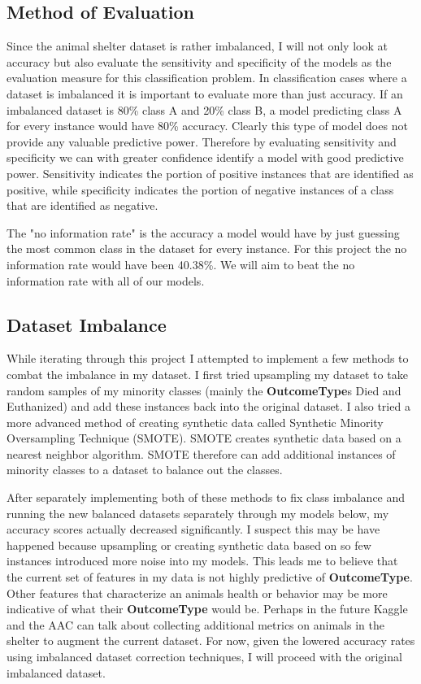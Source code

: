 \documentclass[12pt]{article} %
\begin{document}
\subsection{Method of Evaluation}
Since the animal shelter dataset is rather imbalanced, I will not only look at accuracy but also evaluate the sensitivity and specificity of the models as the evaluation measure for this classification problem. In classification cases where a dataset is imbalanced it is important to evaluate more than just accuracy. If an imbalanced dataset is 80\% class A and 20\% class B, a model predicting class A for every instance would have 80\% accuracy. Clearly this type of model does not provide any valuable predictive power. Therefore by evaluating sensitivity and specificity we can with greater confidence identify a model with good predictive power. Sensitivity indicates the portion of positive instances that are identified as positive, while specificity indicates the portion of negative instances of a class that are identified as negative. 

The "no information rate" is the accuracy a model would have by just guessing the most common class in the dataset for every instance. For this project the no information rate would have been 40.38\%. We will aim to beat the no information rate with all of our models. 

\subsection{Dataset Imbalance}
While iterating through this project I attempted to implement a few methods to combat the imbalance in my dataset. I first tried upsampling my dataset to take random samples of my minority classes (mainly the \textbf{OutcomeType}s Died and Euthanized) and add these instances back into the original dataset. I also tried a more advanced method of creating synthetic data called Synthetic Minority Oversampling Technique (SMOTE). SMOTE creates synthetic data based on a nearest neighbor algorithm. SMOTE therefore can add additional instances of minority classes to a dataset to balance out the classes.

After separately implementing both of these methods to fix class imbalance and running the new balanced datasets separately through my models below, my accuracy scores actually decreased significantly. I suspect this may be have happened because upsampling or creating synthetic data based on so few instances introduced more noise into my models. This leads me to believe that the current set of features in my data is not highly predictive of \textbf{OutcomeType}. Other features that characterize an animals health or behavior may be more indicative of what their \textbf{OutcomeType} would be. Perhaps in the future Kaggle and the AAC can talk about collecting additional metrics on animals in the shelter to augment the current dataset. For now, given the lowered accuracy rates using imbalanced dataset correction techniques, I will proceed with the original imbalanced dataset. 
\end{document}
